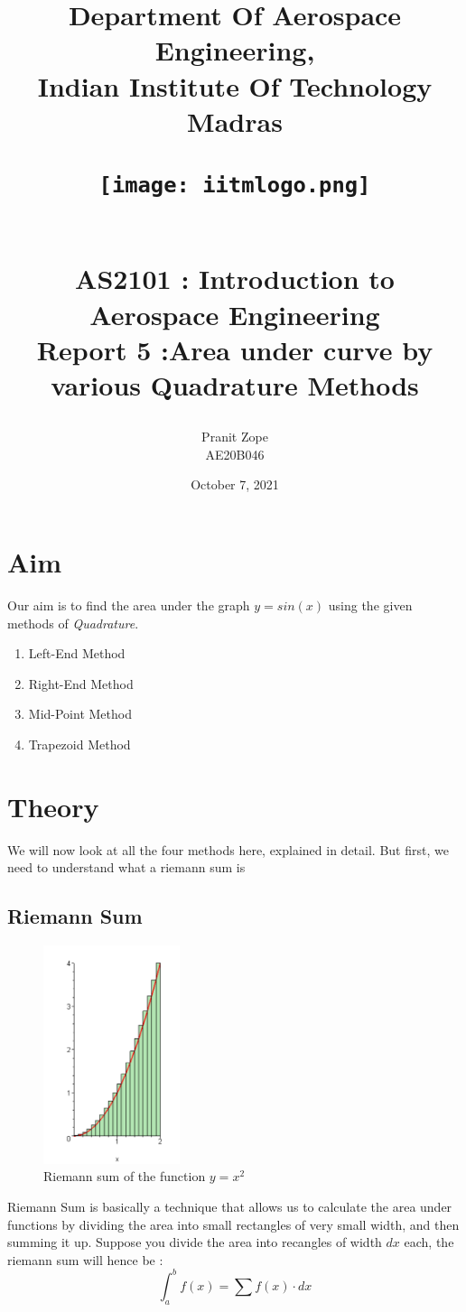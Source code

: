 \documentclass[12pt]{article}
\title{
    Department Of Aerospace Engineering,\\
    Indian Institute Of Technology Madras
    \begin{figure}[H]
        \centering
        \texttt{[image: iitmlogo.png]}
    \end{figure}
    \begin{center}
        \textbf{\\AS2101 : Introduction to Aerospace Engineering\\}
        Report 5 :Area under curve by various Quadrature Methods\\
    \end{center}
}
\author{
    Pranit Zope\\AE20B046
}
\date{October 7, 2021}
\begin{document}
\maketitle
\newpage
{}
\tableofcontents 
\listoffigures

\newpage
\section{Aim}
Our aim is to find the area under the graph $y=sin(x)$ using the given methods of \textit{Quadrature}.
\begin{enumerate}
    \item Left-End Method
    \item Right-End Method
    \item Mid-Point Method
    \item Trapezoid Method
\end{enumerate}

\section{Theory}
We will now look at all the four methods here, explained in detail. But first, we need to understand what a riemann sum is
\subsection{Riemann Sum}
\begin{figure}[H]
    \centering
    \includegraphics[width=4cm]{riemann.png}
    \caption{Riemann sum of the function $y=x^2$}
    \label{fig:rmn}
\end{figure}
Riemann Sum is basically a technique that allows us to calculate the area under functions by dividing the area into small rectangles of very small width, and then summing it up. Suppose you divide the area into recangles of width $dx$ each, the riemann sum will hence be :
\begin{equation*}
    \int^b_a f(x) = \sum f(x) \cdot dx
\end{equation*}
\end{document}
